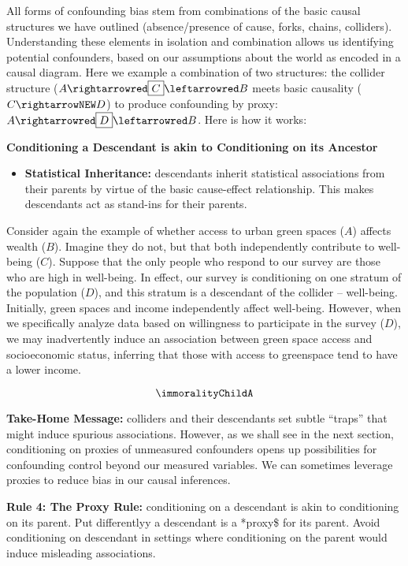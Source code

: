 \documentclass[
  singlecolumn]{article}
\providecommand{\tightlist}{%
  \setlength{\itemsep}{0pt}\setlength{\parskip}{0pt}}\usepackage{longtable,booktabs,array}
\begin{document}
All forms of confounding bias stem from combinations of the basic causal
structures we have outlined (absence/presence of cause, forks, chains,
colliders). Understanding these elements in isolation and combination
allows us identifying potential confounders, based on our assumptions
about the world as encoded in a causal diagram. Here we example a
combination of two structures: the collider structure
(\(A \rightarrowred \boxed{C} \leftarrowred B\) meets basic causality
(\(C\rightarrowNEW D\)) to produce confounding by proxy:
\(A \rightarrowred \boxed{D} \leftarrowred B\). Here is how it works:

\textbf{Conditioning a Descendant is akin to Conditioning on its
Ancestor}

\begin{itemize}
\tightlist
\item
  \textbf{Statistical Inheritance:} descendants inherit statistical
  associations from their parents by virtue of the basic cause-effect
  relationship. This makes descendants act as stand-ins for their
  parents.
\end{itemize}

Consider again the example of whether access to urban green spaces
(\(A\)) affects wealth (\(B\)). Imagine they do not, but that both
independently contribute to well-being (\(C\)). Suppose that the only
people who respond to our survey are those who are high in well-being.
In effect, our survey is conditioning on one stratum of the population
(\(D\)), and this stratum is a descendant of the collider -- well-being.
Initially, green spaces and income independently affect well-being.
However, when we specifically analyze data based on willingness to
participate in the survey (\(\boxed{D}\)), we may inadvertently induce
an association between green space access and socioeconomic status,
inferring that those with access to greenspace tend to have a lower
income.

\[\immoralityChildA\]

\textbf{Take-Home Message:} colliders and their descendants set subtle
``traps'' that might induce spurious associations. However, as we shall
see in the next section, conditioning on proxies of unmeasured
confounders opens up possibilities for confounding control beyond our
measured variables. We can sometimes leverage proxies to reduce bias in
our causal inferences.

\textbf{Rule 4: The Proxy Rule:} conditioning on a descendant is akin to
conditioning on its parent. Put differentlyy a descendant is a *proxy\$
for its parent. Avoid conditioning on descendant in settings where
conditioning on the parent would induce misleading associations.
\end{document}
